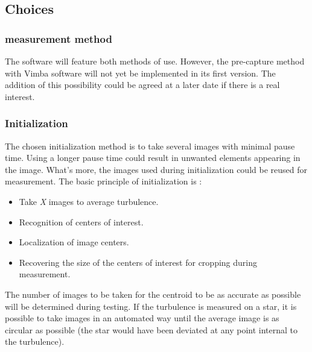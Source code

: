 \subsection{Choices}
\subsubsection{measurement method}
The software will feature both methods of use. However, the pre-capture method with Vimba software will not yet be implemented in its first version.
The addition of this possibility could be agreed at a later date if there is a real interest.
\subsubsection{Initialization}
The chosen initialization method is to take several images with minimal pause time. \newline
Using a longer pause time could result in unwanted elements appearing in the image.
What's more, the images used during initialization could be reused for measurement. The basic principle of initialization is :
\begin{itemize}
    \item Take \textit{X} images to average turbulence.
    \item Recognition of centers of interest.
    \item Localization of image centers.
    \item Recovering the size of the centers of interest for cropping during measurement.
\end{itemize}
The number of images to be taken for the centroid to be as accurate as possible will be determined during testing.
If the turbulence is measured on a star, it is possible to take images in an automated way until the average image
is as circular as possible (the star would have been deviated at any point internal to the turbulence).
